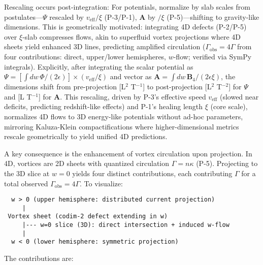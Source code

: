 Rescaling occurs post-integration: For potentials, normalize by slab scales from postulates---$\Psi$ rescaled by $v_{\text{eff}} / \xi$ (P-3/P-1), $\mathbf{A}$ by $/ \xi$ (P-5)---shifting to gravity-like dimensions. This is geometrically motivated: integrating 4D defects (P-2/P-5) over $\xi$-slab compresses flows, akin to superfluid vortex projections where 4D sheets yield enhanced 3D lines, predicting amplified circulation ($\Gamma_{\text{obs}} = 4\Gamma$ from four contributions: direct, upper/lower hemispheres, $w$-flow; verified via SymPy integrals). Explicitly, after integrating the scalar potential as $\Psi = \left[ \int dw \, \Phi / (2\epsilon) \right] \times (v_{\text{eff}} / \xi)$ and vector as $\mathbf{A} = \int dw \, \mathbf{B}_4 / (2\epsilon \xi)$, the dimensions shift from pre-projection [L$^2$ T$^{-1}$] to post-projection [L$^2$ T$^{-2}$] for $\Psi$ and [L T$^{-1}$] for $\mathbf{A}$. This rescaling, driven by P-3's effective speed $v_{\text{eff}}$ (slowed near deficits, predicting redshift-like effects) and P-1's healing length $\xi$ (core scale), normalizes 4D flows to 3D energy-like potentials without ad-hoc parameters, mirroring Kaluza-Klein compactifications where higher-dimensional metrics rescale geometrically to yield unified 4D predictions.

A key consequence is the enhancement of vortex circulation upon projection. In 4D, vortices are 2D sheets with quantized circulation $\Gamma = n \kappa$ (P-5). Projecting to the 3D slice at $w=0$ yields four distinct contributions, each contributing $\Gamma$ for a total observed $\Gamma_{\text{obs}} = 4\Gamma$. To visualize:

\begin{verbatim}
  w > 0 (upper hemisphere: distributed current projection)
     |
 Vortex sheet (codim-2 defect extending in w)
     |--- w=0 slice (3D): direct intersection + induced w-flow
     |
  w < 0 (lower hemisphere: symmetric projection)
\end{verbatim}

The contributions are:

